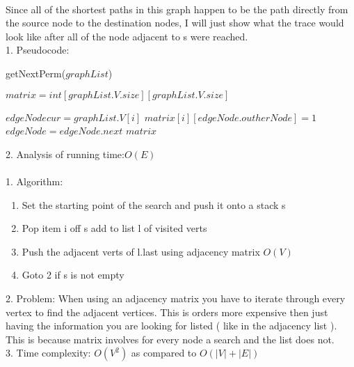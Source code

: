 \documentclass[11pt]{article}
\begin{document}
	\renewcommand{\headrulewidth}{0.4pt}
	\setlength{\headheight}{38.0pt}

	\\
	Since all of the shortest paths in this graph happen to be the path directly from the source node to the destination nodes, I will just show what the trace would look like after all of the node adjacent to s were reached.
	\bigskip	
	\\
	1. Pseudocode:\\
		\begin{algorithm}[H]
				\NoCaptionOfAlgo
				\caption{getNextPerm($graphList$)}
				$matrix = int[graphList.V.size][graphList.V.size]$\;
				
				{
					$edgeNode cur = graphList.V[i]$\;
					{
						$matrix[i][edgeNode.outherNode] = 1$\;
						$edgeNode = edgeNode.next$\;
					}
				}
				\Return $matrix$\;
		\end{algorithm}
	2. Analysis of running time:$O(E)$\\
	
	\bigskip
	\\
	1. Algorithm:
	\begin{enumerate}
		\item Set the starting point of the search and push it onto a stack s
		\item Pop item i off s add to list l of visited verts
		\item Push the adjacent verts of l.last using adjacency matrix $O(V)$
		\item Goto 2 if s is not empty
	\end{enumerate}
	2. Problem: When using an adjacency matrix you have to iterate through every vertex to find the adjacent vertices. This is orders more expensive then just having the information you are looking for listed ( like in the adjacency list ). This is because matrix involves for every node a search and the list does not.\\
	3. Time complexity: $O(V^2)$ as compared to $O(|V|+|E|)$
\end{document}
